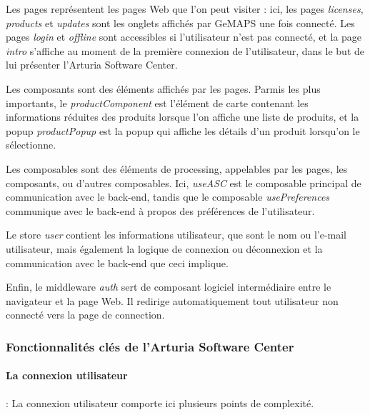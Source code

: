 \documentclass[francais]{rapportPFE}  %
\begin{document}
Les pages représentent les pages Web que l'on peut visiter : ici, les pages \textit{licenses}, \textit{products} et \textit{updates} sont les onglets affichés par GeMAPS une fois connecté. Les pages \textit{login} et \textit{offline} sont accessibles si l'utilisateur n'est pas connecté, et la page \textit{intro} s'affiche au moment de la première connexion de l'utilisateur, dans le but de lui présenter l'Arturia Software Center.

Les composants sont des éléments affichés par les pages. Parmis les plus importants, le \textit{productComponent} est l'élément de carte contenant les informations réduites des produits lorsque l'on affiche une liste de produits, et la popup \textit{productPopup} est la popup qui affiche les détails d'un produit lorsqu'on le sélectionne.

Les composables sont des éléments de processing, appelables par les pages, les composants, ou d'autres composables. Ici, \textit{useASC} est le composable principal de communication avec le back-end, tandis que le composable \textit{usePreferences} communique avec le back-end à propos des préférences de l'utilisateur.

Le store \textit{user} contient les informations utilisateur, que sont le nom ou l'e-mail utilisateur, mais également la logique de connexion ou déconnexion et la communication avec le back-end que ceci implique.

Enfin, le middleware \textit{auth} sert de composant logiciel intermédiaire entre le navigateur et la page Web. Il redirige automatiquement tout utilisateur non connecté vers la page de connection.



\subsubsection{Fonctionnalités clés de l'Arturia Software Center}

\paragraph{La connexion utilisateur}: La connexion utilisateur comporte ici plusieurs points de complexité. 
\end{document}
